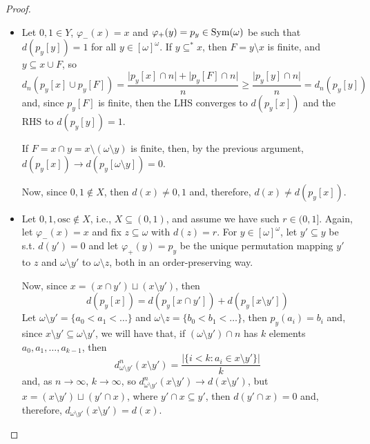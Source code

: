 \begin{proof}
    \begin{itemize}
        \item Let $0,1\in Y$, $\varphi_-(x)=x$ and $\varphi_+(y)=p_y\in\mathrm{Sym}(\omega)$ be such that $d(p_y[y])=1$ for all $y\in[\omega]^\omega$. If $y\subseteq ^*x$, then $F=y\setminus x$ is finite, and $y\subseteq x\cup F$, so
        $$d_n(p_y[x]\cup p_y[F])=\frac{\lvert p_y[x]\cap n\rvert+\lvert p_y[F]\cap n\rvert}n\geq\frac{\lvert p_y[y]\cap n\rvert}n=d_n(p_y[y])$$
        and, since $p_y[F]$ is finite, then the LHS converges to $d(p_y[x])$ and the RHS to $d(p_y[y])=1$.
        
        If $F=x\cap y=x\setminus(\omega\setminus y)$ is finite, then, by the previous argument, $d(p_y[x])\to d(p_y[\omega\setminus y])=0$.

        Now, since $0,1\notin X$, then $d(x)\neq0,1$ and, therefore, $d(x)\neq d(p_y[x])$.
        \item Let $0,1,\text{osc}\notin X$, i.e., $X\subseteq(0,1)$, and assume we have such $r\in(0,1]$. Again, let $\varphi_-(x)=x$ and fix $z\subseteq\omega$ with $d(z)=r$. For $y\in[\omega]^\omega$, let $y'\subseteq y$ be s.t. $d(y')=0$ and let $\varphi_+(y)=p_y$ be the unique permutation mapping $y'$ to $z$ and $\omega\setminus y'$ to $\omega\setminus z$, both in an order-preserving way.

        Now, since $x=(x\cap y')\sqcup(x\setminus y')$, then
        \begin{equation}
            d(p_y[x])=d(p_y[x\cap y'])+d(p_y[x\setminus y'])
        \end{equation}
        Let $\omega\setminus y'=\{a_0<a_1<\dots\}$ and $\omega\setminus z=\{b_0<b_1<\dots\}$, then $p_y(a_i)=b_i$ and, since $x\setminus y'\subseteq\omega\setminus y'$, we will have that, if $(\omega\setminus y')\cap n$ has $k$ elements $a_0,a_1,\dots,a_{k-1}$, then
        $$d_{\omega\setminus y'}^n(x\setminus y')=\frac{\lvert\{i<k:a_i\in x\setminus y'\}\rvert}k$$
        and, as $n\to\infty$, $k\to\infty$, so $d_{\omega\setminus y'}^n(x\setminus y')\to d(x\setminus y')$, but $x=(x\setminus y')\sqcup(y'\cap x)$, where $y'\cap x\subseteq y'$, then $d(y'\cap x)=0$ and, therefore, $d_{\omega\setminus y'}(x\setminus y')=d(x)$.


\end{itemize}
\end{proof}
